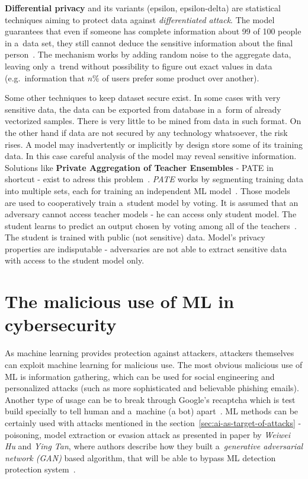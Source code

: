 \textbf{Differential privacy} and its variants (epsilon, epsilon-delta) are statistical techniques aiming to protect data against \textit{differentiated attack}.
The model guarantees that even if someone has complete information about 99 of 100 people in a~data set, they still cannot deduce the sensitive information about the final person~\cite{web:differential-privacy}.
The mechanism works by adding random noise to the aggregate data, leaving only a~trend without possibility to figure out exact values in data (e.g.\ information that \( n\% \) of users prefer some product over another).

Some other techniques to keep dataset secure exist.
In some cases with very sensitive data, the data can be exported from database in a~form of already vectorized samples.
There is very little to be mined from data in such format.
On the other hand if data are not secured by any technology whatsoever, the risk rises.
A model may inadvertently or implicitly by design store some of its training data.
In this case careful analysis of the model may reveal sensitive information.
Solutions like \textbf{Private Aggregation of Teacher Ensembles} - PATE in shortcut - exist to adress this problem~\cite{huawei_security}.
\textit{PATE} works by segmenting training data into multiple sets, each for training an independent ML model~\cite{huawei_security}.
Those models are used to cooperatively train a~student model by voting.
It is assumed that an adversary cannot access teacher models - he can access only student model.
The student learns to predict an output chosen by voting among all of the teachers~\cite{huawei_security}.
The student is trained with public (not sensitive) data.
Model's privacy properties are indisputable - adversaries are not able to extract sensitive data with access to the student model only.

\section{The malicious use of ML in cybersecurity}\label{sec:the-malicious-use-of-ml-in-cybersecurity}

As machine learning provides protection against attackers, attackers themselves can exploit machine learning for malicious use.
The most obvious malicious use of ML is information gathering, which can be used for social engineering and personalized attacks (such as more sophisticated and believable phishing emails).
Another type of usage can be to break through Google's re\acrshort{captcha} which is test build specially to tell human and a~machine (a bot) apart~\cite{blog:breaking_captcha}.
ML methods can be certainly used with attacks mentioned in the section~\ref{sec:ai-as-target-of-attacks} - poisoning, model extraction or evasion attack as presented in paper by \textit{Weiwei Hu} and \textit{Ying Tan},  where authors describe how they built a~\textit{generative adversarial network (GAN)} based algorithm, that will be able to bypass ML detection protection system~\cite{arxiv:real_evasion}.

